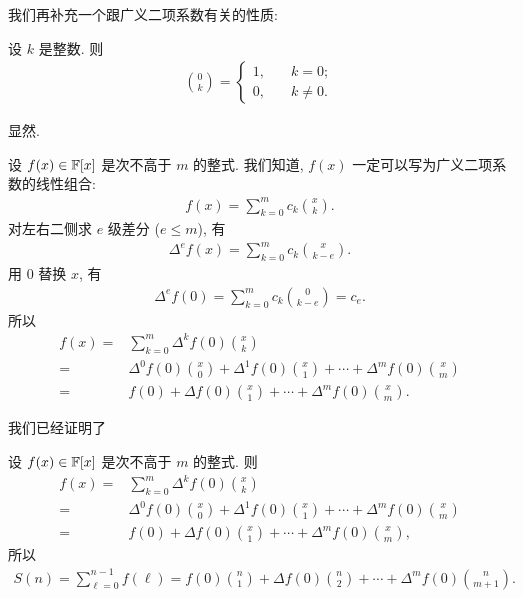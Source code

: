我们再补充一个跟广义二项系数有关的性质:

\begin{proposition}
    设 $k$ 是整数. 则
    \begin{align*}
        \binom{0}{k} = \begin{cases}
            1, & \quad k = 0;    \\
            0, & \quad k \neq 0.
        \end{cases}
    \end{align*}
\end{proposition}

\begin{pf}
    显然.
\end{pf}

设 $f(x) \in \mathbb{F}[x]$ 是次不高于 $m$ 的整式. 我们知道, $f(x)$ 一定可以写为广义二项系数的线性组合:
\begin{align*}
    f(x) = \sum_{k = 0}^{m} c_{k} \binom{x}{k}.
\end{align*}
对左右二侧求 $e$ 级差分 ($e \leq m$), 有
\begin{align*}
    \Delta^e f(x) = \sum_{k = 0}^{m} c_{k} \binom{x}{k - e}.
\end{align*}
用 $0$ 替换 $x$, 有
\begin{align*}
    \Delta^e f(0) = \sum_{k = 0}^{m} c_{k} \binom{0}{k - e} = c_{e}.
\end{align*}
所以
\begin{align*}
    f(x)
    = {} & \sum_{k = 0}^{m} \Delta^k f(0) \binom{x}{k}                                                   \\
    = {} & \Delta^0 f(0) \binom{x}{0} + \Delta^1 f(0) \binom{x}{1} + \cdots + \Delta^m f(0) \binom{x}{m} \\
    = {} & f(0) + \Delta f(0) \binom{x}{1} + \cdots + \Delta^m f(0) \binom{x}{m}.
\end{align*}

我们已经证明了

\begin{proposition}
    设 $f(x) \in \mathbb{F}[x]$ 是次不高于 $m$ 的整式. 则
    \begin{align*}
        f(x)
        = {} & \sum_{k = 0}^{m} \Delta^k f(0) \binom{x}{k}                                                   \\
        = {} & \Delta^0 f(0) \binom{x}{0} + \Delta^1 f(0) \binom{x}{1} + \cdots + \Delta^m f(0) \binom{x}{m} \\
        = {} & f(0) + \Delta f(0) \binom{x}{1} + \cdots + \Delta^m f(0) \binom{x}{m},
    \end{align*}
    所以
    \begin{align*}
        S(n) = \sum_{\ell = 0}^{n - 1} f(\ell) = f(0) \binom{n}{1} + \Delta f(0) \binom{n}{2} + \cdots + \Delta^{m} f(0) \binom{n}{m + 1}.
    \end{align*}
\end{proposition}

